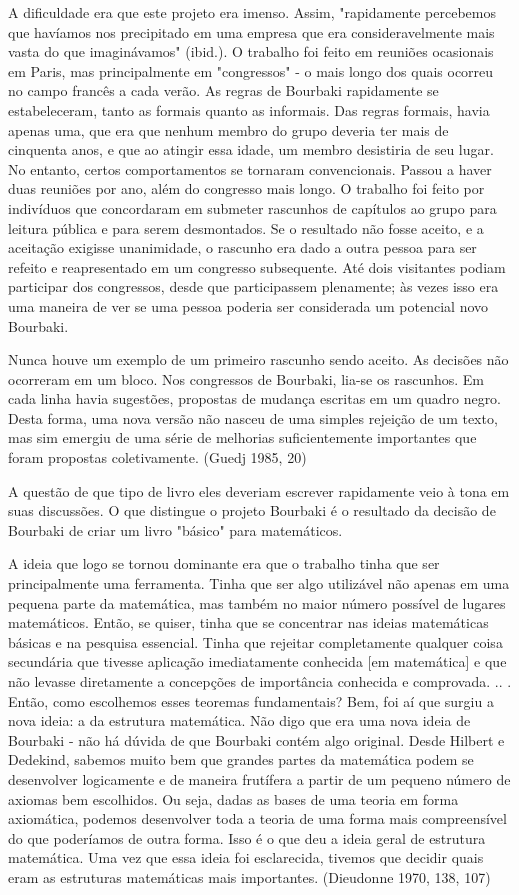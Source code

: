 \documentclass[a4paper,12pt]{article}[abntex2]
\begin{document}
A dificuldade era que este projeto era imenso. Assim, "rapidamente percebemos que havíamos nos precipitado em uma empresa que era consideravelmente mais vasta do que imaginávamos" (ibid.). O trabalho foi feito em reuniões ocasionais em Paris, mas principalmente em "congressos" - o mais longo dos quais ocorreu no campo francês a cada verão. As regras de Bourbaki rapidamente se estabeleceram, tanto as formais quanto as informais. Das regras formais, havia apenas uma, que era que nenhum membro do grupo deveria ter mais de cinquenta anos, e que ao atingir essa idade, um membro desistiria de seu lugar. No entanto, certos comportamentos se tornaram convencionais. Passou a haver duas reuniões por ano, além do congresso mais longo. O trabalho foi feito por indivíduos que concordaram em submeter rascunhos de capítulos ao grupo para leitura pública e para serem desmontados. Se o resultado não fosse aceito, e a aceitação exigisse unanimidade, o rascunho era dado a outra pessoa para ser refeito e reapresentado em um congresso subsequente. Até dois visitantes podiam participar dos congressos, desde que participassem plenamente; às vezes isso era uma maneira de ver se uma pessoa poderia ser considerada um potencial novo Bourbaki.

Nunca houve um exemplo de um primeiro rascunho sendo aceito. As decisões não ocorreram em um bloco. Nos congressos de Bourbaki, lia-se os rascunhos. Em cada linha havia sugestões, propostas de mudança escritas em um quadro negro. Desta forma, uma nova versão não nasceu de uma simples rejeição de um texto, mas sim emergiu de uma série de melhorias suficientemente importantes que foram propostas coletivamente. (Guedj 1985, 20)

A questão de que tipo de livro eles deveriam escrever rapidamente veio à tona em suas discussões. O que distingue o projeto Bourbaki é o resultado da decisão de Bourbaki de criar um livro "básico" para matemáticos.

A ideia que logo se tornou dominante era que o trabalho tinha que ser principalmente uma ferramenta. Tinha que ser algo utilizável não apenas em uma pequena parte da matemática, mas também no maior número possível de lugares matemáticos. Então, se quiser, tinha que se concentrar nas ideias matemáticas básicas e na pesquisa essencial. Tinha que rejeitar completamente qualquer coisa secundária que tivesse aplicação imediatamente conhecida [em matemática] e que não levasse diretamente a concepções de importância conhecida e comprovada. .. . Então, como escolhemos esses teoremas fundamentais? Bem, foi aí que surgiu a nova ideia: a da estrutura matemática. Não digo que era uma nova ideia de Bourbaki - não há dúvida de que Bourbaki contém algo original. Desde Hilbert e Dedekind, sabemos muito bem que grandes partes da matemática podem se desenvolver logicamente e de maneira frutífera a partir de um pequeno número de axiomas bem escolhidos. Ou seja, dadas as bases de uma teoria em forma axiomática, podemos desenvolver toda a teoria de uma forma mais compreensível do que poderíamos de outra forma. Isso é o que deu a ideia geral de estrutura matemática. Uma vez que essa ideia foi esclarecida, tivemos que decidir quais eram as estruturas matemáticas mais importantes. (Dieudonne 1970, 138, 107)
\end{document}
